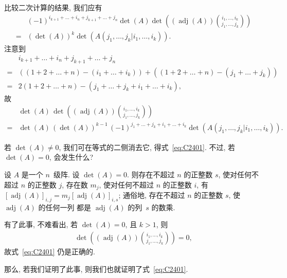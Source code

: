 比较二次计算的结果, 我们应有
\begin{align*}
         &
    (-1)^{i_{k+1}+\dots+i_n+j_{k+1}+\dots+j_n}
    \det {(A)}
    \det {\left(
        (\operatorname{adj} {(A)})
        \binom{i_1,\dots,i_k}{j_1,\dots,j_k}
        \right)}
    \\
    = {} &
    (\det {(A)})^k
    \det {(A({j_1,\dots,j_k}|{i_1,\dots,i_k}))}.
\end{align*}
注意到
\begin{align*}
         &
    i_{k+1} + \dots + i_n + j_{k+1} + \dots + j_n
    \\
    = {} &
    ((1 + 2 + \dots + n) - (i_1 + \dots + i_k))
    + ((1 + 2 + \dots + n) - (j_1 + \dots + j_k))
    \\
    = {} &
    2(1 + 2 + \dots + n) - (j_1 + \dots + j_k + i_1 + \dots + i_k),
\end{align*}
故
\begin{align*}
         &
    \det {(A)}\,
    \det {\left(
        (\operatorname{adj} {(A)})
        \binom{i_1,\dots,i_k}{j_1,\dots,j_k}
        \right)}
    \\
    = {} &
    \det {(A)}\, (\det {(A)})^{k-1}\,
    (-1)^{j_1+\dots+j_k+i_1+\dots+i_k}
    \det {(A({j_1,\dots,j_k}|{i_1,\dots,i_k}))}.
\end{align*}

若 \(\det {(A)} \neq 0\),
我们可在等式的二侧消去它, 得式~\eqref{eq:C2401}.
不过, 若 \(\det {(A)} = 0\),
会发生什么?

\begin{theorem}
    设 \(A\) 是一个 \(n\)~级阵.
    设 \(\det {(A)} = 0\).
    则存在不超过 \(n\) 的正整数 \(s\),
    使对任何不超过 \(n\) 的正整数 \(j\),
    存在数 \(m_j\),
    使对任何不超过 \(n\) 的正整数 \(i\),
    有
    \([\operatorname{adj} {(A)}]_{i,j}
    = m_j [\operatorname{adj} {(A)}]_{i,s}\);
    通俗地,
    存在不超过 \(n\) 的正整数 \(s\),
    使 \(\operatorname{adj} {(A)}\) 的任何一列
    都是 \(\operatorname{adj} {(A)}\) 的列~\(s\) 的数乘.
\end{theorem}

有了此事, 不难看出, 若 \(\det {(A)} = 0\),
且 \(k > 1\), 则
\begin{align*}
    \det {\left(
        (\operatorname{adj} {(A)})
        \binom{i_1,\dots,i_k}{j_1,\dots,j_k}
        \right)} = 0,
\end{align*}
故式~\eqref{eq:C2401} 仍是正确的.

那么, 若我们证明了此事, 则我们也就证明了式~\eqref{eq:C2401}.

